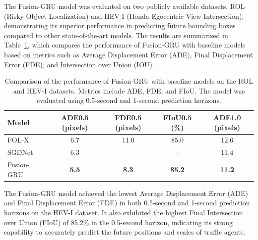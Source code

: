 \documentclass[12pt,oneside]{book} %
\begin{document}
The Fusion-GRU model was evaluated on two publicly available datasets, ROL
(Risky Object Localization) and HEV-I (Honda Egocentric View-Intersection),
demonstrating its superior performance in predicting future bounding boxes
compared to other state-of-the-art models. The results are summarized in
Table~\ref{tab:fusion-gru-results}, which compares the performance of
Fusion-GRU with baseline models based on metrics such as Average Displacement
Error (ADE), Final Displacement Error (FDE), and Intersection over Union (IOU).

\begin{table}[H]
    \centering
    \caption{Comparison of the performance of Fusion-GRU with baseline models on the ROL and HEV-I datasets. Metrics include ADE, FDE, and FIoU. The model was evaluated using 0.5-second and 1-second prediction horizons.}
    \begin{adjustbox}{max width=\textwidth}
        \begin{tabular}{lcccc}
            \toprule
            \textbf{Model}              & \textbf{ADE0.5 (pixels)} & \textbf{FDE0.5 (pixels)} & \textbf{FIoU0.5 (\%)} & \textbf{ADE1.0 (pixels)} \\ 
            \midrule
            FOL-X~\cite{FusionGRU}      & 6.7                      & 11.0                     & 85.0                  & 12.6                     \\
            SGDNet~\cite{FusionGRU}     & 6.3                      & --                       & --                    & 11.4                     \\
            Fusion-GRU~\cite{FusionGRU} & \textbf{5.5}             & \textbf{8.3}             & \textbf{85.2}         & \textbf{11.2}            \\
            \bottomrule
        \end{tabular}
    \end{adjustbox}
    \label{tab:fusion-gru-results}
\end{table}

The Fusion-GRU model achieved the lowest Average Displacement Error (ADE) and
Final Displacement Error (FDE) in both 0.5-second and 1-second prediction
horizons on the HEV-I dataset. It also exhibited the highest Final Intersection
over Union (FIoU) of 85.2\% in the 0.5-second horizon, indicating its strong
capability to accurately predict the future positions and scales of traffic
agents.

\end{document}

